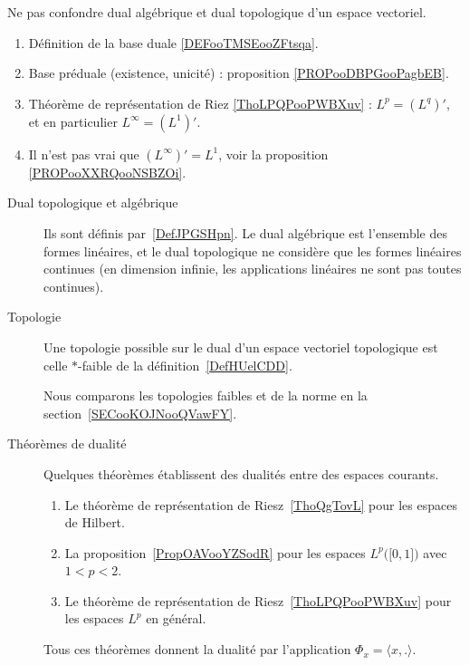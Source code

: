 
     \label{THEMEooULGFooPscFJC}

Ne pas confondre dual algébrique et dual topologique d'un espace vectoriel.

\begin{enumerate}
	\item
	      Définition de la base duale \ref{DEFooTMSEooZFtsqa}.
	\item
	      Base préduale (existence, unicité) : proposition \ref{PROPooDBPGooPagbEB}.
	\item
	      Théorème de représentation de Riez \ref{ThoLPQPooPWBXuv} : \( L^p=(L^q)'\), et en particulier \( L^{\infty}=(L^1)'\).
	\item
	      Il n'est pas vrai que \( (L^{\infty})'=L^1\), voir la proposition \ref{PROPooXXRQooNSBZOi}.
\end{enumerate}

\begin{description}
	\item[Dual topologique et algébrique]
	      Ils sont définis par~\ref{DefJPGSHpn}. Le dual algébrique est l'ensemble des formes linéaires, et le dual topologique ne considère que les formes linéaires continues (en dimension infinie, les applications linéaires ne sont pas toutes continues).
	\item[Topologie]
	      Une topologie possible sur le dual d'un espace vectoriel topologique est celle \( *\)-faible de la définition~\ref{DefHUelCDD}.

	      Nous comparons les topologies faibles et de la norme en la section~\ref{SECooKOJNooQVawFY}.
	\item[Théorèmes de dualité]
	      Quelques théorèmes établissent des dualités entre des espaces courants.
	      \begin{enumerate}
		      \item
		            Le théorème de représentation de Riesz~\ref{ThoQgTovL} pour les espaces de Hilbert.
		      \item
		            La proposition~\ref{PropOAVooYZSodR} pour les espaces \( L^p\big( \mathopen[ 0 , 1 \mathclose] \big)\) avec \( 1<p<2\).
		      \item
		            Le théorème de représentation de Riesz~\ref{ThoLPQPooPWBXuv} pour les espaces \( L^p\) en général.
	      \end{enumerate}
	      Tous ces théorèmes donnent la dualité par l'application \( \Phi_x=\langle x, .\rangle \).

\end{description}
